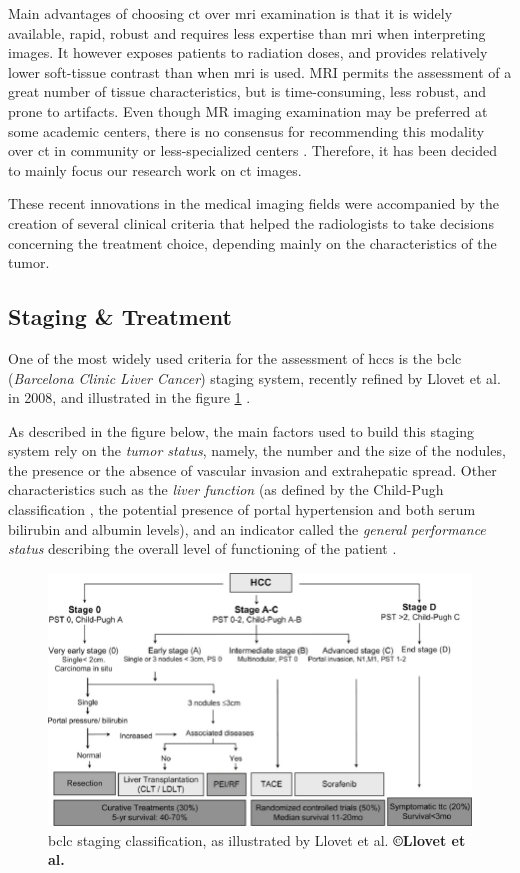 Main advantages of choosing \ac{ct} over \ac{mri} examination is that it is widely
available, rapid, robust and requires less expertise than \ac{mri} when
interpreting images. It however exposes patients to radiation doses, and
provides relatively lower soft-tissue contrast than when \ac{mri} is used.
MRI permits the assessment of a great number of tissue characteristics,
but is time-consuming, less robust, and prone to artifacts. Even though
MR imaging examination may be preferred at some academic centers, there
is no consensus for recommending this modality over \ac{ct} in community or
less-specialized centers \cite{Choi2014a,Heimbach2018}.
Therefore, it has been decided to mainly focus our research work on \ac{ct}
images.

These recent innovations in the medical imaging fields were accompanied
by the creation of several clinical criteria that helped the
radiologists to take decisions concerning the treatment choice,
depending mainly on the characteristics of the tumor.

\subsection{Staging \& Treatment}\label{staging-treatment}

One of the most widely used criteria for the assessment of \ac{hcc}s
is the \ac{bclc} (\emph{Barcelona Clinic Liver Cancer}) staging system, recently refined by Llovet et al. in
2008, and illustrated in the figure \ref{BCLC_llovet} \cite{Llovet2008}.

As described in the figure below, the main factors used to build this
staging system rely on the \emph{tumor status}, namely, the number and
the size of the nodules, the presence or the absence of vascular
invasion and extrahepatic spread. Other characteristics such as the
\emph{liver function} (as defined by the Child-Pugh classification
\cite{Pugh1973} , the potential presence of portal
hypertension and both serum bilirubin and albumin levels), and an
indicator called the \emph{general performance status} describing the
overall level of functioning of the patient \cite{Oken1982}.

\begin{figure}[th!]
\centering
\includegraphics[width=0.8\linewidth]{images/BCLC}
\caption{\ac{bclc} staging classification, as illustrated by Llovet et al. \textbf{©Llovet et al. \cite{Llovet2008}}}
\label{BCLC_llovet}
\end{figure}



